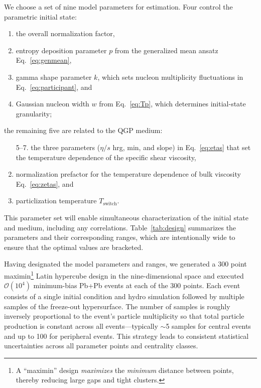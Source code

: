 \documentclass[aps,prc,reprint,amsmath,nofootinbib]{revtex4-1}
\newcommand{\order}[1]{$\mathcal O(10^{#1})$}
\begin{document}
We choose a set of nine model parameters for estimation.
Four control the parametric initial state:
\begin{enumerate}[itemsep=0pt]
  \item the overall normalization factor,
  \item entropy deposition parameter $p$ from the generalized mean ansatz Eq.~\eqref{eq:genmean},
  \item gamma shape parameter $k$, which sets nucleon multiplicity fluctuations in Eq.~\eqref{eq:participant}, and
  \item Gaussian nucleon width $w$ from Eq.~\eqref{eq:Tp}, which determines initial-state granularity;
\end{enumerate}
the remaining five are related to the QGP medium:
\begin{enumerate}[itemsep=0pt]
  \item[5--7.] the three parameters ($\eta/s$ hrg, min, and slope) in Eq.~\eqref{eq:etas} that set the temperature dependence of the specific shear viscosity,
  \setcounter{enumi}{7}
  \item normalization prefactor for the temperature dependence of bulk viscosity Eq.~\eqref{eq:zetas}, and
  \item particlization temperature $T_\text{switch}$.
\end{enumerate}
This parameter set will enable simultaneous characterization of the initial state and medium, including any correlations.
Table~\ref{tab:design} summarizes the parameters and their corresponding ranges, which are intentionally wide to ensure that the optimal values are bracketed.

Having designated the model parameters and ranges, we generated a 300 point maximin\footnote{A ``maximin'' design \emph{maximizes} the \emph{minimum} distance between points, thereby reducing large gaps and tight clusters.} Latin hypercube design \cite{Morris:1995lh} in the nine-dimensional space and executed \order 4 minimum-bias Pb+Pb events at each of the 300 points.
Each event consists of a single initial condition and hydro simulation followed by multiple samples of the freeze-out hypersurface.
The number of samples is roughly inversely proportional to the event's particle multiplicity so that total particle production is constant across all events---typically ${\sim}$5 samples for central events and up to 100 for peripheral events.
This strategy leads to consistent statistical uncertainties across all parameter points and centrality classes.
\end{document}
